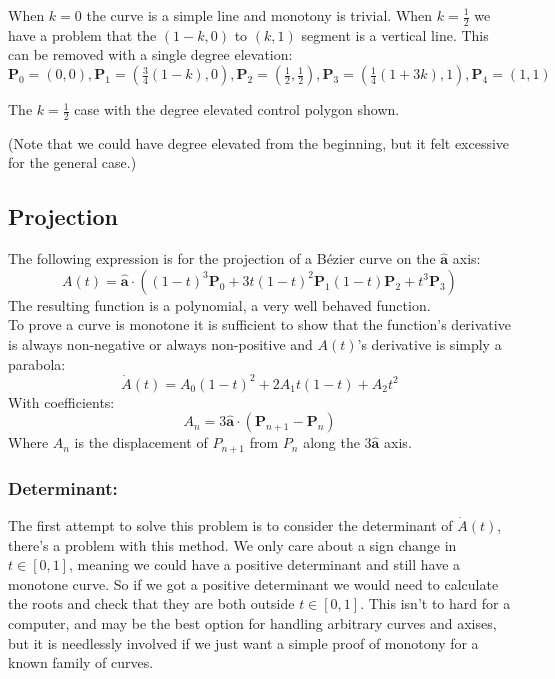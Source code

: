 When $k=0$ the curve is a simple line and monotony is trivial.
When $k=\frac{1}{2}$ we have a problem that the $(1-k,0)$ to $(k,1)$ segment is a vertical line.
This can be removed with a single degree elevation:
\[\mathbf{P}_0 = (0,0),\mathbf{P}_1 = \left(\tfrac{3}{4}(1-k),0\right),\mathbf{P}_2 = \left(\tfrac{1}{2},\tfrac{1}{2}\right),\mathbf{P}_3=\left(\tfrac{1}{4}(1+3k),1\right),\mathbf{P}_4=(1,1)\]
\begin{center}

The $k=\frac{1}{2}$ case with the degree elevated control polygon shown.
\end{center}
(Note that we could have degree elevated from the beginning,
but it felt excessive for the general case.)

\subsection{Projection}
The following expression is for the projection of a Bézier curve on the $\hat{\mathbf{a}}$ axis:
\[A(t) = \hat{\mathbf{a}}\cdot\left((1-t)^3\mathbf{P}_0+3t(1-t)^2\mathbf{P}_1(1-t)\mathbf{P}_2+t^3\mathbf{P}_3\right)\]
The resulting function is a polynomial, a very well behaved function.
\\

To prove a curve is monotone it is sufficient to show that the function's derivative is always non-negative or always non-positive and $A(t)$'s  derivative is simply a parabola:
\[\dot{A}(t) = A_0(1-t)^2+2A_1t(1-t)+A_2t^2\]
With coefficients:
\[A_n = 3\hat{\mathbf{a}}\cdot\left(\mathbf{P}_{n+1}-\mathbf{P}_n\right)\]
Where $A_n$ is the displacement of $P_{n+1}$ from $P_{n}$ along the $3\hat{\mathbf{a}}$ axis.

\subsubsection{Determinant:}
The first attempt to solve this problem is to consider the determinant of $\dot{A}(t)$,
there's a problem with this method.
We only care about a sign change in $t\in[0,1]$,
meaning we could have a positive determinant and still have a monotone curve.
So if we got a positive determinant we would need to calculate the roots and check that they are both outside $t\in[0,1]$.
This isn't to hard for a computer,
and may be the best option for handling arbitrary curves and axises,
but it is needlessly involved if we just want a simple proof of monotony for a known family of curves.
\\

